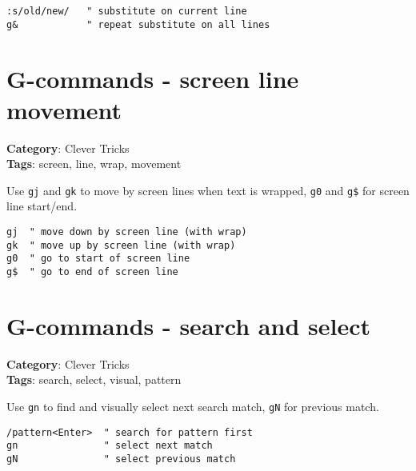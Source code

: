 {{{\begin{Exa*}{}
\begin{Verbatim}[fontsize=\footnotesize, breaklines, breakanywhere]
:s/old/new/   " substitute on current line
g&            " repeat substitute on all lines
\end{Verbatim}
\end{Exa*}

\section{G-commands - screen line movement}

\textbf{Category}: Clever Tricks\\ \textbf{Tags}: screen, line, wrap, movement
\vspace{0.5cm}

Use {\footnotesize \Verb§gj§} and {\footnotesize \Verb§gk§} to move by screen lines when text is wrapped, {\footnotesize \Verb§g0§} and {\footnotesize \Verb§g$§} for screen line start/end.

\begin{Exa*}{}
\begin{Verbatim}[fontsize=\footnotesize, breaklines, breakanywhere]
gj  " move down by screen line (with wrap)
gk  " move up by screen line (with wrap)
g0  " go to start of screen line
g$  " go to end of screen line
\end{Verbatim}
\end{Exa*}

\section{G-commands - search and select}

\textbf{Category}: Clever Tricks\\ \textbf{Tags}: search, select, visual, pattern
\vspace{0.5cm}

Use {\footnotesize \Verb§gn§} to find and visually select next search match, {\footnotesize \Verb§gN§} for previous match.

\begin{Exa*}{}
\begin{Verbatim}[fontsize=\footnotesize, breaklines, breakanywhere]
/pattern<Enter>  " search for pattern first
gn               " select next match
gN               " select previous match
\end{Verbatim}
\end{Exa*}

}}}
